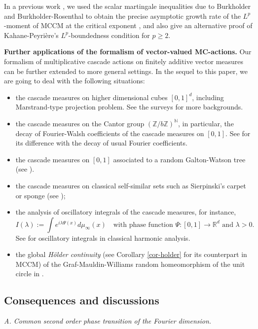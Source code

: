 \documentclass[12pt]{amsart}
\theoremstyle{definition}
\theoremstyle{remark}
\newcommand{\R}{\mathbb{R}}
\newcommand{\N}{\mathbb{N}}
\newcommand{\Z}{\mathbb{Z}}
\numberwithin{equation}{section}
\begin{document}
In a previous work \cite{HQW-23}, we used  the scalar martingale inequalities due to Burkholder and Burkholder-Rosenthal  to  obtain the precise asymptotic growth rate of the $L^p$-moment  of MCCM  at the critical exponent \cite[Theorem 1.2]{HQW-23}, and also give an alternative proof of Kahane-Peyri\`ere’s $L^p$-boundedness condition \cite[Proposition 1.3]{HQW-23} for $p\ge 2$. 



{\flushleft \bf Further applications of the formalism of vector-valued MC-actions.}
Our  formalism of multiplicative cascade actions on finitely additive vector measures can be further extended to more general settings. In the sequel to this paper, we are going to  deal with the following situations: 
\begin{itemize}
	\item the cascade measures on higher dimensional cubes $[0,1]^d$,  including Marstrand-type projection problem.
	See the surveys \cite{FFJ15,Mat19} for more  backgrounds. 
	\item the cascade measures on  the Cantor group $(\Z/b\Z)^\N$, in particular, the decay of  Fourier-Walsh coefficients of  the cascade measures on $[0,1]$. See \cite{PQ09} for its difference with the decay of usual Fourier coefficients. 
	\item the cascade measures on $[0,1]$ associated to a random Galton-Watson tree (see \cite{Way05}).
	\item the cascade measures on classical  self-similar sets such as Sierpinski's carpet or sponge (see \cite{Bar13, LBM15}); 
	\item the analysis of   oscillatory integrals of the cascade measures, for instance, 
	\[
	I(\lambda):=\int e^{i \lambda\Psi(x)} d\mu_\infty(x) \quad  \text{with phase function $\Psi: [0,1]\rightarrow \R^d$ and $\lambda>0$}.
	\] 
	See \cite[Chapters VIII and IX]{S93} for oscillatory integrals in classical harmonic analysis.
	\item  the  global {\it H\"older continuity} (see  Corollary \ref{cor-holder} for its counterpart in MCCM) of the Graf-Mauldin-Williams random homeomorphism of the unit circle in  \cite{RA-Homeo}. 
\end{itemize}


\subsection{Consequences and discussions}


{\flushleft\it A.  Common second order phase transition of the Fourier dimension.}
\end{document}
